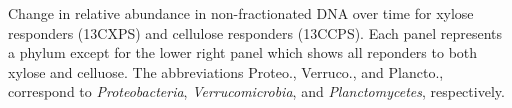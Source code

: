 Change in relative abundance in non-fractionated DNA over time for xylose
responders (13CXPS) and cellulose responders (13CCPS). Each panel represents
a phylum except for the lower right panel which shows all reponders to both
xylose and celluose. The abbreviations Proteo., Verruco., and Plancto.,
correspond to \textit{Proteobacteria}, \textit{Verrucomicrobia}, and \textit{Planctomycetes},
respectively.

